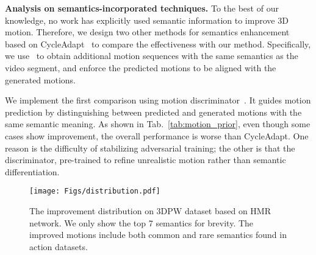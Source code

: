  


\noindent\textbf{Analysis on semantics-incorporated techniques.} 
To the best of our knowledge, no work has explicitly used semantic information to improve 3D motion.  
Therefore, we design two other methods for semantics enhancement 
based on CycleAdapt~\cite{cycleadapt} to compare the effectiveness with our method. 
Specifically, we use~\cite{motiongpt} to obtain additional motion sequences with the same semantics as the video segment, and enforce the predicted motions to be aligned with the generated motions.

 
We implement the first comparison using motion discriminator~\cite{vibe}.
It guides motion prediction by distinguishing between predicted and generated motions with the same semantic meaning.
As shown in Tab.~\ref{tab:motion_prior}, even though some cases show improvement, the overall performance is worse than CycleAdapt.  
One reason is the difficulty of stabilizing adversarial training; the other is that the discriminator, pre-trained to refine unrealistic motion rather than semantic differentiation.

\begin{figure}[t]
    \centering
        \texttt{[image: Figs/distribution.pdf]}
    \caption{The improvement distribution on 3DPW dataset based on HMR network. We only show the top 7 semantics for brevity. The improved motions include both common and rare semantics found in action datasets.}  
    \label{fig:improve_distribution}
    \vspace{-0.2in}
\end{figure}

\begin{table}[!thp]
    \caption{Comparison of fill-in threshold influence on model performance (MPJPE) on the 3DPW dataset.  
    Balancing 2D pose quantity and quality can boost model performance.}
    \label{tab:threshold_2d}
    \centering
    \vspace{-0.2in}
\end{table}

